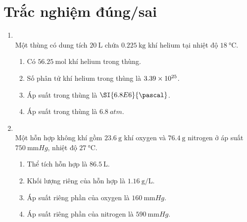 \begin{enumerate}[label=\bfseries Câu \arabic*:, leftmargin=1.7cm]
\end{enumerate}

\section{Trắc nghiệm đúng/sai}
\begin{enumerate}[label=\bfseries Câu \arabic*:, leftmargin=1.7cm]
	\item {}\\
	Một thùng có dung tích $\SI{20}{\liter}$ chứa $\SI{0.225}{\kilogram}$ khí helium tại nhiệt độ $\SI{18}{\celsius}$.
	\begin{enumerate}[label=\alph*)]
		\item Có $\SI{56.25}{\mole}$ khí helium trong thùng.
		\item Số phân tử khí helium trong thùng là $\SI{3.39E25}{}$.
		\item Áp suất trong thùng là $\SI{6.8E6}{\pascal}$.
		\item Áp suất trong thùng là $\SI{6.8}{atm}$.
	\end{enumerate}

\item{}\\
Một hỗn hợp không khí gồm $\SI{23.6}{\gram}$ khí oxygen và $\SI{76.4}{\gram}$ nitrogen ở áp suất $\SI{750}{\milli\meter Hg}$, nhiệt độ $\SI{27}{\celsius}$.
\begin{enumerate}[label=\alph*)]
	\item Thể tích hỗn hợp là $\SI{86.5}{\liter}$.
	\item  Khối lượng riêng của hỗn hợp là $\SI{1.16}{\gram/\liter}$.
	\item Áp suất riêng phần của oxygen là $\SI{160}{\milli\meter Hg}$.
	\item Áp suất riêng phần của nitrogen là $\SI{590}{\milli\meter Hg}$.
\end{enumerate}
	

\end{enumerate}
